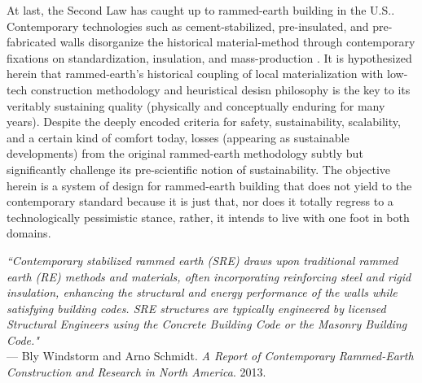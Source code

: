 At last, the Second Law has caught up to rammed-earth building in the U.S.. Contemporary technologies such as cement-stabilized, pre-insulated, and pre-fabricated walls disorganize the historical material-method through contemporary fixations on standardization, insulation, and mass-production \cite{MOECONVERGENCE}. It is hypothesized herein that rammed-earth's historical coupling of local materialization with low-tech construction methodology and heuristical desisn philosophy is the key to its veritably sustaining quality (physically and conceptually enduring for many years). Despite the deeply encoded criteria for safety, sustainability, scalability, and a certain kind of comfort today, losses (appearing as sustainable developments) from the original rammed-earth methodology subtly but significantly challenge its pre-scientific notion of sustainability. The objective herein is a system of design for rammed-earth building that does not yield to the contemporary standard because it is just that, nor does it totally regress to a technologically pessimistic stance, rather, it intends to live with one foot in both domains.

\begin{flushright}
\small{
\textit{
``Contemporary stabilized rammed earth (SRE) draws upon traditional rammed earth (RE) methods and materials, often incorporating reinforcing steel and rigid insulation, enhancing the structural and energy performance of the walls while satisfying building codes. SRE structures are typically engineered by licensed Structural Engineers using the Concrete Building Code or the Masonry Building Code."}} \\ --- Bly Windstorm and Arno Schmidt. \textit{A Report of Contemporary Rammed-Earth Construction and Research in North America}. 2013.
\end{flushright}


